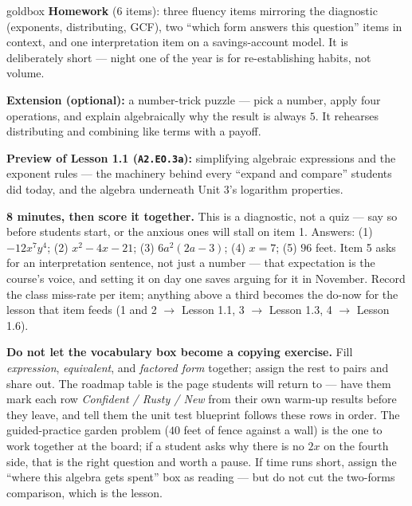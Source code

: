 \documentclass[10pt]{article}
\begin{document}
\boxguard[18]
\begin{skillbox}{goldbox}
\textbf{Homework} (6 items): three fluency items mirroring the diagnostic (exponents,
distributing, GCF), two ``which form answers this question'' items in context, and one
interpretation item on a savings-account model. It is deliberately short --- night one of the
year is for re-establishing habits, not volume.

\textbf{Extension (optional):} a number-trick puzzle --- pick a number, apply four operations,
and explain algebraically why the result is always $5$. It rehearses distributing and combining
like terms with a payoff.

\textbf{Preview of Lesson 1.1 (\texttt{A2.EO.3a}):} simplifying algebraic expressions and the
exponent rules --- the machinery behind every ``expand and compare'' students did today, and the
algebra underneath Unit 3's logarithm properties.
\end{skillbox}

\begin{teachernote}[Warm-Up]
    \textbf{8 minutes, then score it together.} This is a diagnostic, not a quiz --- say so
    before students start, or the anxious ones will stall on item 1. Answers:
    (1) $-12x^7y^4$; (2) $x^2-4x-21$; (3) $6a^2(2a-3)$; (4) $x=7$; (5) $96$ feet.
    Item 5 asks for an interpretation sentence, not just a number --- that expectation is the
    course's voice, and setting it on day one saves arguing for it in November. Record the
    class miss-rate per item; anything above a third becomes the do-now for the lesson that item
    feeds (1 and 2 $\to$ Lesson 1.1, 3 $\to$ Lesson 1.3, 4 $\to$ Lesson 1.6).
\end{teachernote}

\begin{teachernote}
    \textbf{Do not let the vocabulary box become a copying exercise.} Fill \emph{expression},
    \emph{equivalent}, and \emph{factored form} together; assign the rest to pairs and share
    out. The roadmap table is the page students will return to --- have them mark each row
    \emph{Confident / Rusty / New} from their own warm-up results before they leave, and tell
    them the unit test blueprint follows these rows in order. The guided-practice garden problem
    ($40$ feet of fence against a wall) is the one to work together at the board; if a student
    asks why there is no $2x$ on the fourth side, that is the right question and worth a pause.
    If time runs short, assign the ``where this algebra gets spent'' box as reading --- but do
    not cut the two-forms comparison, which is the lesson.
\end{teachernote}
\end{document}
